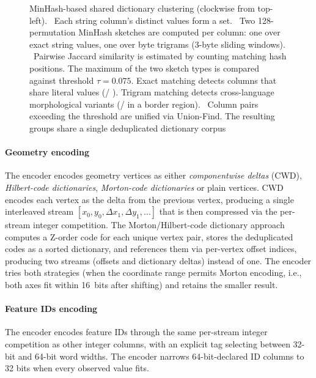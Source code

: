{\begin{figure}[htbp]
{\begin{tikzpicture}
    \end{tikzpicture}}
    \caption{
MinHash-based shared dictionary clustering (clockwise from top-left).
        ~Each string column's distinct values form a set.
        ~Two 128-permutation MinHash sketches are computed per column: one over exact string values, one over byte trigrams (3-byte sliding windows).
        ~Pairwise Jaccard similarity is estimated by counting matching hash positions.
The maximum of the two sketch types is compared against threshold $\tau = 0.075$.
        Exact matching detects columns that share literal values (\texttt{}/ \texttt{}).
Trigram matching detects cross-language morphological variants (\texttt{}/ \texttt{} in a border region).
        ~Column pairs exceeding the threshold are unified via Union-Find.
The resulting groups share a single deduplicated dictionary corpus}
    \label{fig:minhash_clustering}
\end{figure}

\paragraph{Geometry encoding}
The encoder encodes geometry vertices as either \emph{componentwise deltas} (CWD), \emph{Hilbert-code dictionaries}, \emph{Morton-code dictionaries} or plain vertices.
CWD encodes each vertex as the delta from the previous vertex, producing a single interleaved stream $[x_0, y_0, \Delta x_1, \Delta y_1, \ldots]$ that is then compressed via the per-stream integer competition.
The Morton/Hilbert-code dictionary approach computes a Z-order code for each unique vertex pair, stores the deduplicated codes as a sorted dictionary, and references them via per-vertex offset indices, producing two streams (offsets and dictionary deltas) instead of one.
The encoder tries both strategies (when the coordinate range permits Morton encoding, i.e., both axes fit within 16~bits after shifting) and retains the smaller result.


\paragraph{Feature IDs encoding}
The encoder encodes feature IDs through the same per-stream integer competition as other integer columns, with an explicit tag selecting between 32-bit and 64-bit word widths.
The encoder narrows 64-bit-declared ID columns to 32 bits when every observed value fits.

}
